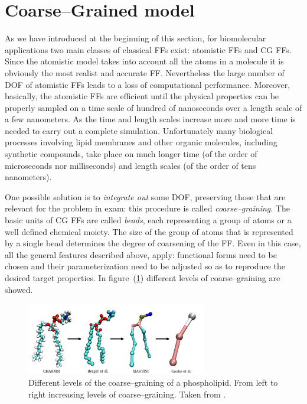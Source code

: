 \section{Coarse--Grained model}
\label{sec:CGModel}
As we have introduced at the beginning of this section, for biomolecular applications two main classes of
classical \acp{FF} exist: atomistic \acp{FF} and \ac{CG} \acp{FF}. Since the atomistic model takes into account
all the atoms in a molecule it is obviously the most realist and accurate \ac{FF}. Nevertheless the large number
of \ac{DOF} of atomistic \acp{FF} leads to a loss of computational performance. Moreover, basically, the
atomistic \acp{FF} are efficient until the physical properties can be properly sampled on a time scale of 
hundred of nanoseconds over a length scale of a few nanometers. As the time and length scales increase more and 
more time is needed to carry out a complete simulation. Unfortunately many biological processes involving lipid 
membranes and other organic molecules, including synthetic compounds, take place on much longer time (of the 
order of microseconds nor milliseconds) and length scales (of the order of tens nanometers).

One possible solution is to \textit{integrate out} some \ac{DOF}, preserving those that are relevant for the
problem in exam: this procedure is called \textit{coarse--graining}. The basic units of \ac{CG} \acp{FF} are
called \textit{beads}, each representing a group of atoms or a well defined chemical moiety. The size of the
group of atoms that is represented by a single bead determines the degree of coarsening of the \ac{FF}. Even in
this case, all the general features described above, apply: functional forms need to be chosen and their
parameterization need to be adjusted so as to reproduce the desired target properties. In figure~(\ref{fig:CGLevels}) different levels of coarse--graining are showed.
\begin{figure}[h!t]
	\centering
	\includegraphics[width=0.7\textwidth]{./img/CGMapping}
	\caption{Different levels of the coarse--graining of a phospholipid. From left to right increasing levels of coarse--graining. Taken from \cite{CoarseGrainingMapping}.}%
	\label{fig:CGLevels}
\end{figure}

